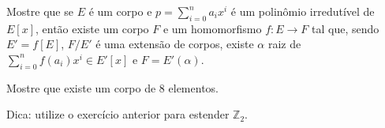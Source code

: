 \begin{exer}
 Mostre que se $E$ é um corpo e $p=\sum_{i=0}^n a_i x^i$ é um polinômio irredutível de $E[x]$, então existe um corpo $F$ e um homomorfismo $f:E\rightarrow F$ tal que, sendo $E'=f[E]$, $F/E'$ é uma extensão de corpos, existe $\alpha$ raiz de $\sum_{i=0}^n f(a_i)x^i \in E'[x]$ e $F=E'(\alpha)$.
\end{exer}

\begin{exer}
 Mostre que existe um corpo de 8 elementos.

 Dica: utilize o exercício anterior para estender $\mathbb Z_2$.
\end{exer}

